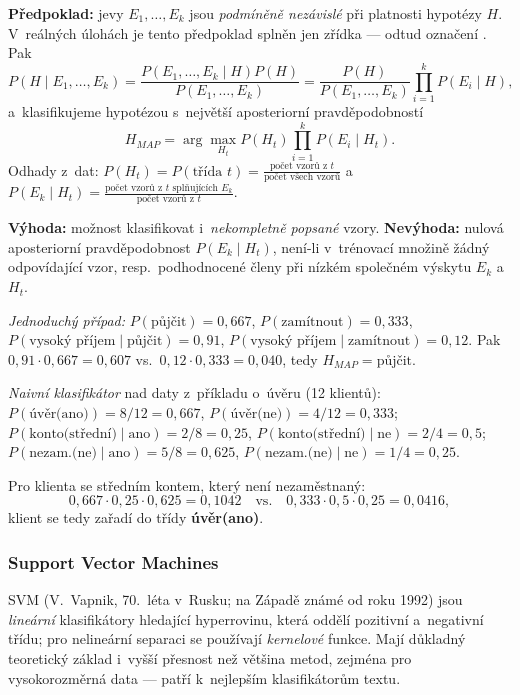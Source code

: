 \documentclass[11pt,a4paper]{article}
\theoremstyle{definition}
\begin{document}
\begin{defbox}
\textbf{Předpoklad:} jevy $E_1,\dots,E_k$ jsou \emph{podmíněně nezávislé} při platnosti
hypotézy $H$. V~reálných úlohách je tento předpoklad splněn jen zřídka --- odtud označení
. Pak
\[ P(H\mid E_1,\dots,E_k)=\frac{P(E_1,\dots,E_k\mid H)P(H)}{P(E_1,\dots,E_k)}
   =\frac{P(H)}{P(E_1,\dots,E_k)}\prod_{i=1}^{k}P(E_i\mid H), \]
a~klasifikujeme hypotézou s~největší aposteriorní pravděpodobností
\[ H_{MAP}=\arg\max_{H_t} P(H_t)\prod_{i=1}^{k}P(E_i\mid H_t). \]
Odhady z~dat: $P(H_t)=P(\text{třída }t)=\frac{\text{počet vzorů z~}t}{\text{počet všech
vzorů}}$ a~$P(E_k\mid H_t)=\frac{\text{počet vzorů z~}t\text{ splňujících }E_k}
{\text{počet vzorů z~}t}$.

\textbf{Výhoda:} možnost klasifikovat i~\emph{nekompletně popsané} vzory.
\textbf{Nevýhoda:} nulová aposteriorní pravděpodobnost $P(E_k\mid H_t)$, není-li
v~trénovací množině žádný odpovídající vzor, resp.\ podhodnocené členy při nízkém společném
výskytu $E_k$ a~$H_t$.
\end{defbox}

\begin{defbox}
\emph{Jednoduchý případ:} $P(\text{půjčit})=0{,}667$, $P(\text{zamítnout})=0{,}333$,
$P(\text{vysoký příjem}\mid\text{půjčit})=0{,}91$,
$P(\text{vysoký příjem}\mid\text{zamítnout})=0{,}12$. Pak
$0{,}91\cdot 0{,}667=0{,}607$ vs.\ $0{,}12\cdot 0{,}333=0{,}040$, tedy
$H_{MAP}=\text{půjčit}$.

\emph{Naivní klasifikátor} nad daty z~příkladu o~úvěru (12 klientů):
$P(\text{úvěr(ano)})=8/12=0{,}667$, $P(\text{úvěr(ne)})=4/12=0{,}333$;
$P(\text{konto(střední)}\mid\text{ano})=2/8=0{,}25$,
$P(\text{konto(střední)}\mid\text{ne})=2/4=0{,}5$;
$P(\text{nezam.(ne)}\mid\text{ano})=5/8=0{,}625$,
$P(\text{nezam.(ne)}\mid\text{ne})=1/4=0{,}25$.

Pro klienta se středním kontem, který není nezaměstnaný:
\[ 0{,}667\cdot 0{,}25\cdot 0{,}625=0{,}1042 \quad\text{vs.}\quad
   0{,}333\cdot 0{,}5\cdot 0{,}25=0{,}0416, \]
klient se tedy zařadí do třídy \textbf{úvěr(ano)}.
\end{defbox}

\subsubsection{Support Vector Machines}

SVM (V.~Vapnik, 70.~léta v~Rusku; na Západě známé od roku 1992) jsou \emph{lineární}
klasifikátory hledající hyperrovinu, která oddělí pozitivní a~negativní třídu; pro nelineární
separaci se používají \emph{kernelové} funkce. Mají důkladný teoretický základ i~vyšší přesnost
než většina metod, zejména pro vysokorozměrná data --- patří k~nejlepším klasifikátorům textu.
\end{document}
